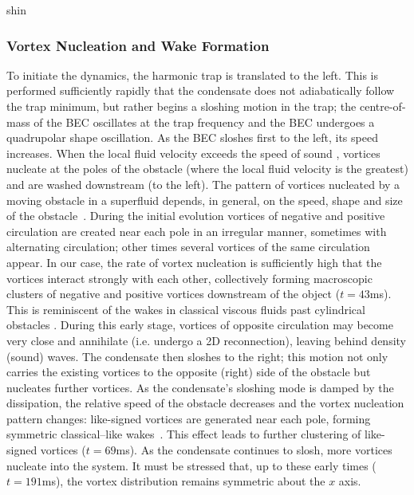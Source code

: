 \begin{chapter}{\label{cha:shin}shin}
\subsubsection{Vortex Nucleation and Wake Formation}

To initiate the dynamics, the harmonic trap is translated to the left.  This is performed sufficiently rapidly that the condensate does not adiabatically follow the trap minimum, but rather begins a sloshing motion in the trap; the centre-of-mass of the BEC oscillates at the trap frequency and the BEC undergoes a quadrupolar shape oscillation.  As the BEC sloshes first to the left, its speed increases.  When the local fluid velocity exceeds the speed of sound \cite{frisch92}, vortices nucleate at the poles of the obstacle
(where the local fluid velocity is the greatest) 
and are washed downstream (to the left).  
The pattern of vortices nucleated by a moving obstacle 
in a superfluid depends, in general, on the  speed, shape and size of 
the obstacle~\citep{jma00,sasaki_suzuki_10,stagg_parker_14}. 
During the initial evolution vortices of negative
and positive circulation are created near each pole in an 
irregular manner, sometimes with alternating circulation;  
other times several vortices of the same circulation appear.  
In our case, the rate of vortex nucleation is sufficiently 
high that the vortices interact strongly with each other, 
collectively forming macroscopic clusters of negative and positive 
vortices downstream of the object ($t=43$ms).  This is reminiscent of the wakes in classical viscous fluids past cylindrical obstacles \cite{stagg_parker_14}.  
During this early stage, vortices of opposite 
circulation may become very close and annihilate (i.e. undergo 
a 2D reconnection), leaving behind density (sound) waves. The condensate then sloshes to the right; this 
motion not only carries the existing vortices to the opposite 
(right) side of the obstacle but nucleates further vortices. 
As the condensate's sloshing mode is damped by 
the dissipation, the relative speed of the obstacle decreases
and the vortex nucleation pattern changes: 
like-signed vortices are generated near each pole, 
forming symmetric classical--like wakes~\cite{stagg_parker_14}. 
This effect leads to further clustering of like-signed vortices   
($t=69$ms). As the condensate continues to slosh, more
vortices nucleate into the system. It must be stressed that,
up to these early times ($t=191$ms), the vortex distribution remains symmetric 
about the $x$ axis.   %


\end{chapter}
